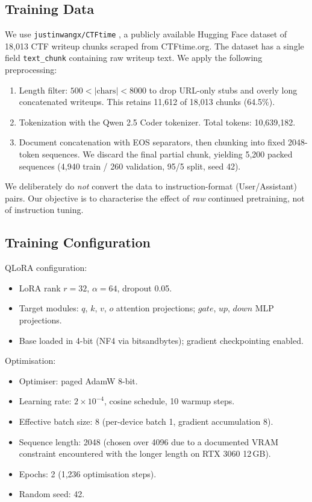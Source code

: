 \documentclass[10pt,twocolumn,a4paper]{article}
\begin{document}
\subsection{Training Data}

We use \texttt{justinwangx/CTFtime} \cite{justinwangx2024ctftime}, a publicly available Hugging Face dataset of 18{,}013 CTF writeup chunks scraped from CTFtime.org. The dataset has a single field \texttt{text\_chunk} containing raw writeup text. We apply the following preprocessing:

\begin{enumerate}
\item Length filter: $500 < |\text{chars}| < 8000$ to drop URL-only stubs and overly long concatenated writeups. This retains 11{,}612 of 18{,}013 chunks (64.5\%).
\item Tokenization with the Qwen 2.5 Coder tokenizer. Total tokens: 10{,}639{,}182.
\item Document concatenation with EOS separators, then chunking into fixed 2048-token sequences. We discard the final partial chunk, yielding 5{,}200 packed sequences (4{,}940 train / 260 validation, 95/5 split, seed 42).
\end{enumerate}

We deliberately do \emph{not} convert the data to instruction-format (User/Assistant) pairs. Our objective is to characterise the effect of \emph{raw} continued pretraining, not of instruction tuning.

\subsection{Training Configuration}

QLoRA configuration:

\begin{itemize}
\item LoRA rank $r = 32$, $\alpha = 64$, dropout 0.05.
\item Target modules: $q$, $k$, $v$, $o$ attention projections; $gate$, $up$, $down$ MLP projections.
\item Base loaded in 4-bit (NF4 via bitsandbytes); gradient checkpointing enabled.
\end{itemize}

Optimisation:
\begin{itemize}
\item Optimiser: paged AdamW 8-bit.
\item Learning rate: $2\times 10^{-4}$, cosine schedule, 10 warmup steps.
\item Effective batch size: 8 (per-device batch 1, gradient accumulation 8).
\item Sequence length: 2048 (chosen over 4096 due to a documented VRAM constraint encountered with the longer length on RTX 3060 12\,GB).
\item Epochs: 2 (1{,}236 optimisation steps).
\item Random seed: 42.
\end{itemize}
\end{document}
